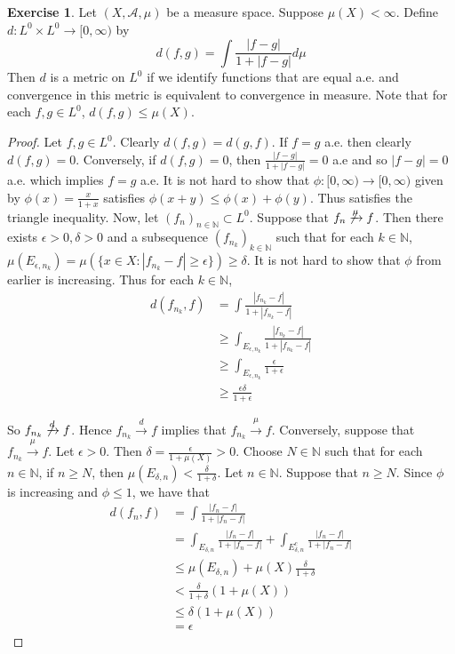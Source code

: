 \documentclass[12pt]{amsart}
\theoremstyle{definition}
\newtheorem{ex}[definition]{Exercise}
\newcommand{\del}{\delta}
\newcommand{\ep}{\epsilon}
\newcommand{\N}{\mathbb{N}}
\newcommand{\MA}{\mathcal{A}}
\newcommand{\Rg}{[0,\infty)}
\newcommand{\conv}[1]{\xrightarrow{#1}}
\newcommand{\lex}[1]{\label{ex:#1}}
\begin{document}
	\begin{ex} \lex{35007} 
		Let $(X, \MA, \mu)$ be a measure space. Suppose $\mu(X) < \infty$. Define $d:L^0 \times L^0 \rightarrow \Rg$ by $$d(f,g) = \int \frac{|f-g|}{1+|f-g|} d \mu $$
		Then $d$ is a metric on $L^0$ if we identify functions that are equal a.e. and convergence in this metric is equivalent to convergence in measure. Note that for each $f,g \in L^0$, $d(f,g) \leq \mu(X)$.
	\end{ex} 
	
	\begin{proof}
		Let $f,g \in L^0$. Clearly $d(f,g) = d(g,f)$. If $f = g$ a.e. then clearly $d(f,g) = 0$. Conversely, if $d(f,g) = 0$, then $\frac{|f-g|}{1 + |f-g|} = 0$ a.e and so $|f-g| = 0$ a.e. which implies $f =g$ a.e. It is not hard to show that $\phi: \Rg \rightarrow \Rg$ given by $\phi(x) = \frac{x}{1+x}$ satisfies $\phi(x+y) \leq \phi(x)+\phi(y)$. Thus satisfies the triangle inequality. Now, let $(f_n)_{n \in \N} \subset L^0$. Suppose that $f_n \not \conv{\mu} f$. Then there exists $\ep>0, \del>0$ and a subsequence $(f_{n_k})_{k \in \N}$ such that for each $k \in \N$, $\mu(E_{\ep,n_k}) = \mu(\{x \in X: |f_{n_k} - f| \geq \ep\}) \geq \del $. It is not hard to show that $\phi$ from earlier is increasing. Thus for each $k \in \N$, 
		\begin{align*}
			d(f_{n_k},f)
			&= \int \frac{|f_{n_k} -f|}{1+|f_{n_k} -f|}\\
			& \geq \int_{E_{\ep,n_k}} \frac{|f_{n_k} -f|}{1+|f_{n_k} -f|}\\
			& \geq \int_{E_{\ep, n_k}} \frac{\ep}{1+\ep}\\
			& \geq \frac{\ep\del}{1+\ep}
		\end{align*}
		
		So $f_{n_k} \not \conv{d} f$. Hence $f_{n_k} \conv{d} f$ implies that $f_{n_k} \conv{\mu} f$. Conversely, suppose that $f_{n_k} \conv{\mu} f$. Let $\ep >0.$ Then $\del = \frac{\ep}{1+\mu(X)} > 0$. Choose $N \in \N$ such that for each $n \in \N$, if $n \geq N$, then $\mu(E_{\del, n}) < \frac{\del}{1+\del}$. Let $n \in \N$. Suppose that $n \geq N$. Since $\phi$ is increasing and $\phi \leq 1$, we have that 
		\begin{align*}
			d(f_n,f)
			&= \int \frac{|f_n -f|}{1+|f_n -f|}\\
			&= \int_{E_{\del,n}} \frac{|f_n -f|}{1+|f_n -f|} + \int_{E_{\del,n}^c} \frac{|f_n -f|}{1+|f_n -f|}\\
			&\leq \mu(E_{\del,n}) + \mu(X)\frac{\del}{1+\del}\\
			& < \frac{\del}{1+\del}(1+\mu(X))\\
			& \leq \del(1+\mu(X))\\
			& = \ep
		\end{align*}
	\end{proof}
	
\end{document}
